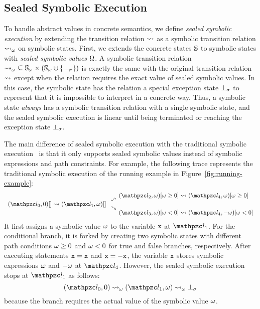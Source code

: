 \subsection{Sealed Symbolic Execution}

To handle abstract values in concrete semantics, we define \textit{sealed
symbolic execution} by extending the transition relation $\leadsto$ as a symbolic
transition relation ${\leadsto}_\omega$ on symbolic states.  First, we extends the
concrete states $\mathbb{S}$ to symbolic states with \textit{sealed symbolic values}
$\Omega$.  A symbolic transition relation ${\leadsto}_\omega \subseteq {\mathbb{S}}_\omega
\times ({\mathbb{S}}_\omega \uplus \{ \bot_\sigma \})$ is exactly the same with the original
transition relation $\leadsto$ except when the relation requires the exact value
of sealed symbolic values.  In this case, the symbolic state has the relation a
special exception state $\bot_\sigma$ to represent that it is impossible to interpret
in a concrete way.  Thus, a symbolic state \textit{always} has a symbolic
transition relation with a single symbolic state, and the sealed symbolic
execution is linear until being terminated or reaching the exception state
$\bot_\sigma$.

The main difference of sealed symbolic execution with the traditional symbolic
execution~\cite{symbolic} is that it only supports sealed symbolic values
instead of symbolic expressions and path constraints.  For example, the
following trace represents the traditional symbolic execution of the running
example in Figure~\ref{fig:running-example}:
\[
  \begin{array}{r@{~}c@{~}l}
    &&(\lab_2, \symb)[\symb \geq 0] \trans (\lab_4, \symb)[\symb \geq 0]
    \vspace*{-0.5em}\\
    &\rutrans&
    \vspace*{-0.5em}\\
    (\lab_0, 0)[] \trans (\lab_1, \symb)[]&&
    \vspace*{-0.5em}\\
    &\rdtrans&
    \vspace*{-0.5em}\\
    &&(\lab_3, \symb)[\symb < 0] \trans (\lab_4, -\symb)[\symb < 0]\\
  \end{array}
\]
It first assigns a symbolic value $\omega$ to the variable $\texttt{x}$ at $\lab_1$.
For the conditional branch, it is forked by creating two symbolic states with
different path conditions $\omega \geq 0$ and $\omega < 0$ for true and false
branches, respectively.  After executing statements $\texttt{x} = \texttt{x}$ and $\texttt{x} =
-\texttt{x}$, the variable $\texttt{x}$ stores symbolic expressions $\omega$ and $-\omega$ at
$\lab_4$.  However, the sealed symbolic execution stops at $\lab_1$ as follows:
\[
  (\lab_0, 0) \; \symbtrans \; (\lab_1, \symb) \; \symbtrans \; \excst
\]
because the branch requires the actual value of the symbolic value $\omega$.

